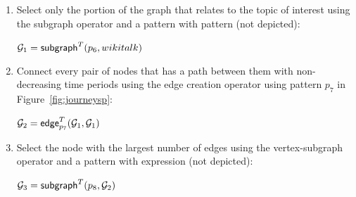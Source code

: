 \begin{enumerate}[itemindent=\dimexpr\labelwidth+\labelsep\relax,leftmargin=0pt]
\item Select only the portion of the graph that relates to the topic
  of interest using the subgraph operator and a pattern with
   pattern (not depicted):

$\mathcal{G}_1 = \textsf{subgraph}^T(p_6,wikitalk)$

\item Connect every pair of nodes that has a path between them with non-decreasing time periods using the edge creation operator using pattern $p_7$ in Figure~\ref{fig:journeysp}:

$\mathcal{G}_2 = \textsf{edge}^T_{p_7}(\mathcal{G}_1,\mathcal{G}_1)$


\item Select the node with the largest number of edges using the vertex-subgraph operator and a pattern with  expression (not depicted):

$\mathcal{G}_3 = \textsf{subgraph}^T(p_8,\mathcal{G}_2)$
\end{enumerate}

